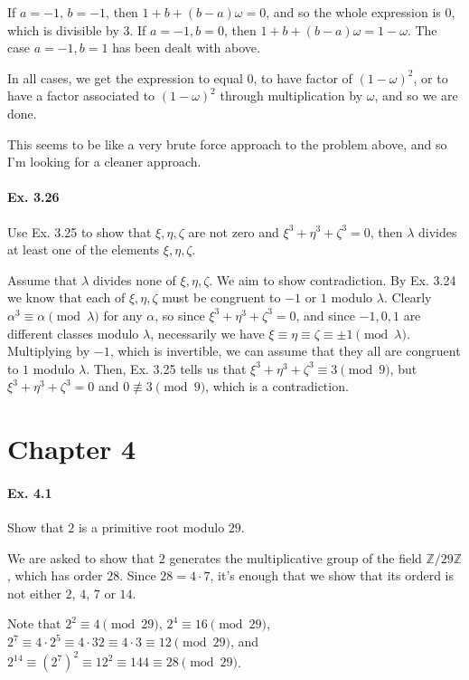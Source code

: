 \documentclass[notitlepage]{article}
\theoremstyle{definition}
\newcommand\Z{\mathbb{Z}}
\begin{document}
If $a = -1$, $b = -1$, then $1 + b + (b - a)\omega = 0$, and so the
whole expression is 0, which is divisible by 3. If $a = -1, b = 0$,
then $1 +b + (b-a)\omega = 1 - \omega$. The case $a = -1, b = 1$ has
been dealt with above.

In all cases, we get the expression to equal 0, to have factor of
$(1-\omega)^2$, or to have a factor associated to $(1-\omega)^2$
through multiplication by $\omega$, and so we are done.

This seems to be like a very brute force approach to the problem
above, and so I'm looking for a cleaner approach.

\paragraph{Ex. 3.26}
Use Ex. 3.25 to show that $\xi, \eta, \zeta$ are not zero and $\xi^3 +
\eta^3 + \zeta^3 = 0$, then $\lambda$ divides at least one of the
elements $\xi, \eta, \zeta$.

Assume that $\lambda$ divides none of $\xi, \eta, \zeta$. We aim to
show contradiction. By Ex. 3.24 we know that each of $\xi, \eta,
\zeta$ must be congruent to $-1$ or $1$ modulo $\lambda$. Clearly
$\alpha^3 \equiv \alpha \pmod \lambda$ for any $\alpha$, so since
$\xi^3 + \eta^3 + \zeta^3 = 0$, and since $-1, 0, 1$ are different
classes modulo $\lambda$, necessarily we have $\xi \equiv \eta \equiv
\zeta \equiv \pm 1 \pmod \lambda$. Multiplying by $-1$, which is
invertible, we can assume that they all are congruent to $1$ modulo
$\lambda$. Then, Ex. 3.25 tells us that $\xi^3 + \eta^3 + \zeta^3
\equiv 3 \pmod 9$, but $\xi^3 + \eta^3 + \zeta^3 = 0$ and $0 \not
\equiv 3 \pmod 9$, which is a contradiction.

\section{Chapter 4}

\paragraph{Ex. 4.1}
Show that $2$ is a primitive root modulo $29$.

We are asked to show that $2$ generates the multiplicative group of
the field $\Z/29\Z$, which has order $28$. Since $28 = 4 \cdot 7$,
it's enough that we show that its orderd is not either $2$, $4$, $7$
or $14$.

Note that $2^2 \equiv 4 \pmod {29}$, $2^4 \equiv 16 \pmod {29}$, $2^7
\equiv 4 \cdot 2^5 \equiv 4 \cdot 32 \equiv 4 \cdot 3 \equiv 12 \pmod
{29}$, and $2^{14} \equiv (2^7)^2 \equiv 12^2 \equiv 144 \equiv 28 \pmod
{29}$.
\end{document}
